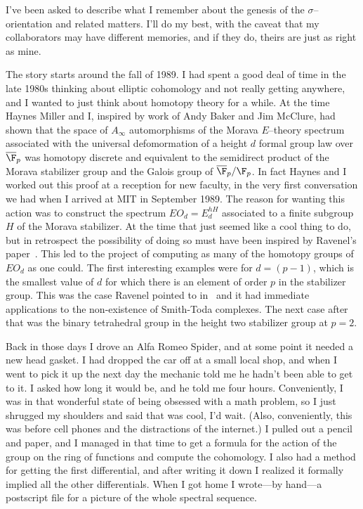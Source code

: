 
I've been asked to describe what I remember about the genesis of the
$\sigma$--orientation and related matters.  I'll do my best, with the
caveat that my collaborators may have different memories, and if they do,
theirs are just as right as mine.

The story starts around the fall of 1989.  I had spent a good deal of
time in the late 1980s thinking about elliptic cohomology and not
really getting anywhere, and I wanted to just think about homotopy
theory for a while.  At the time Haynes Miller and I, inspired by work
of Andy Baker and Jim McClure, had shown that the space of
$A_{\infty}$ automorphisms of the Morava $E$--theory spectrum
associated with the universal defomormation of a height $d$ formal
group law over $\overline{\F}_{p}$ was homotopy discrete and equivalent to
the semidirect product of the Morava stabilizer group and the Galois
group of $\overline{\F}_{p}/\F_{p}$.  In fact Haynes and I worked out this
proof at a reception for new faculty, in the very first conversation
we had when I arrived at MIT in September 1989.  The reason for
wanting this action was to construct the spectrum $EO_{d}=E_{d}^{hH}$
associated to a finite subgroup $H$ of the Morava stabilizer.  At the
time that just seemed like a cool thing to do, but in retrospect the
possibility of doing so must have been inspired by Ravenel's
paper~\cite{RavenelNonexistenceArfInvariantElts}.  This led to the project of computing as many of
the homotopy groups of $EO_{d}$ as one could.  The first interesting
examples were for $d=(p-1)$, which is the smallest value of $d$ for
which there is an element of order $p$ in the stabilizer group.  This
was the case Ravenel pointed to in~\cite{RavenelNonexistenceArfInvariantElts} and it had immediate
applications to the non-existence of Smith-Toda complexes.  The next
case after that was the binary tetrahedral group in the height two
stabilizer group at $p=2$.

Back in those days I drove an Alfa Romeo Spider, and at some point it
needed a new head gasket.  I had dropped the car off at a small local
shop, and when I went to pick it up the next day the mechanic told me
he hadn't been able to get to it.  I asked how long it would be, and he
told me four hours.  Conveniently, I was in that wonderful state of being
obsessed with a math problem, so I just shrugged my shoulders and said
that was cool, I'd wait.  (Also, conveniently, this was before cell
phones and the distractions of the internet.)  I pulled out a pencil
and paper, and I managed in that time to get a formula for the action of
the group on the ring of functions and compute the cohomology.  I also
had a method for getting the first differential, and after writing it
down I realized it formally implied all the other differentials.  When
I got home I wrote---by hand---a postscript file for a picture of the
whole spectral sequence.

